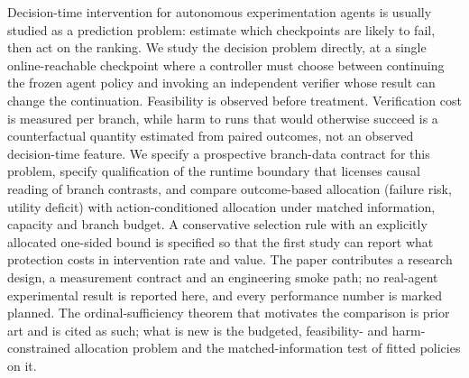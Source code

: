 Decision-time intervention for autonomous experimentation agents is usually
studied as a prediction problem: estimate which checkpoints are likely to fail,
then act on the ranking.  We study the decision problem directly, at a single
online-reachable checkpoint where a controller must choose between continuing
the frozen agent policy and invoking an independent verifier whose result can
change the continuation.  Feasibility is observed before treatment. Verification cost is measured per
branch, while harm to runs that would otherwise succeed is a counterfactual
quantity estimated from paired outcomes, not an observed decision-time feature.  We specify a
prospective branch-data contract for this problem, specify qualification of the runtime boundary
that licenses causal reading of branch contrasts, and compare outcome-based
allocation (failure risk, utility deficit) with action-conditioned allocation
under matched information, capacity and branch budget.  A conservative
selection rule with an explicitly allocated one-sided bound is specified so
that the first study can report what protection costs in intervention rate and
value.  The paper contributes a research design, a measurement contract and an
engineering smoke path; no real-agent experimental result is reported here, and
every performance number is marked planned.  The ordinal-sufficiency theorem
that motivates the comparison is prior art and is cited as such; what is new is
the budgeted, feasibility- and harm-constrained allocation problem and the
matched-information test of fitted policies on it.

